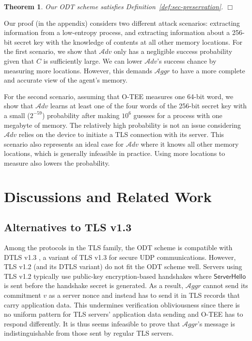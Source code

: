 \documentclass[letterpaper,twocolumn,10pt]{article}
\newcommand{\T}{\ensuremath{\mathcal{A}ggr}\xspace}
\newcommand{\adv}{\mathcal{A}dv}
\newtheorem{theorem}{Theorem}
\begin{document}
\begin{theorem}
\label{thm:sec-pre}
  Our ODT scheme satisfies Definition~\ref{def:sec-preservation}. $\Box$
\end{theorem}

Our proof (in the appendix) considers two different attack scenarios: extracting information from a low-entropy process, and extracting information about a 256-bit secret key with the knowledge of contents at all other memory locations.
For the first scenario, we show that $\adv$ only has a negligible success probability given that $C$ is sufficiently large.
We can lower $\adv$'s success chance by measuring more locations.
However, this demands \T to have a more complete and accurate view of the agent's memory.

For the second scenario, assuming that O-TEE measures one 64-bit word, we show that $\adv$ learns at least one of the four words of the 256-bit secret key with a small ($2^{-59}$) probability after making $10^6$ guesses for a process with one megabyte of memory.
The relatively high probability is not an issue considering $\adv$ relies on the device to initiate a TLS connection with its server.
This scenario also represents an ideal case for $\adv$ where it knows all other memory locations, which is generally infeasible in practice.
Using more locations to measure also lowers the probability.


\section{Discussions and Related Work}
\label{sec:discussion}
%
\subsection{Alternatives to TLS v1.3}
Among the protocols in the TLS family, the ODT scheme is compatible with DTLS v1.3 \cite{DTLS13},
a variant of TLS v1.3 for secure UDP communications.
However, TLS v1.2 \cite{TLS12} (and its DTLS variant) do not fit the ODT scheme well. Servers using TLS v1.2
typically use public-key encryption-based handshakes where $\mathsf{ServerHello}$ is sent before the handshake
secret is generated. As a result, \T cannot send its commitment $v$ as a server nonce and instead
has to send it in TLS records that carry application data. This undermines verification obliviousness
since there is no uniform pattern for TLS servers' application data sending and O-TEE has to respond differently.
It is thus seems infeasible to prove that \T's message is indistinguishable from those sent by regular TLS servers.
\end{document}
